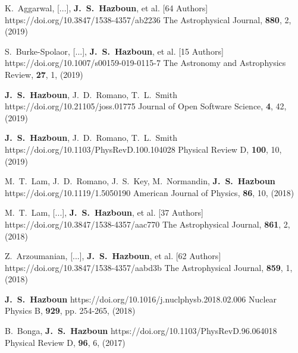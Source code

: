          {K.~{Aggarwal}, [...], \textbf{J.~S.~{Hazboun}}, et al. [64 Authors]}
         {https://doi.org/10.3847/1538-4357/ab2236}
         {{The Astrophysical Journal}, \textbf{880}, 2, (2019)}

         {S.~{Burke-Spolaor}, [...], \textbf{J.~S.~{Hazboun}}, et al. [15 Authors]}
         {https://doi.org/10.1007/s00159-019-0115-7}
         {{The Astronomy and Astrophysics Review}, \textbf{27}, 1, (2019)}

         {\textbf{J.~S.~Hazboun}, J.~D.~{Romano}, T.~L.~{Smith}}
         {https://doi.org/10.21105/joss.01775}
         {{Journal of Open Software Science}, \textbf{4}, 42, (2019)}

         {\textbf{J.~S.~Hazboun}, J.~D.~{Romano}, T.~L.~{Smith}}
         {https://doi.org/10.1103/PhysRevD.100.104028}
         {{Physical Review D}, \textbf{100}, 10, (2019)}

         {M.~T.~{Lam}, J.~D.~{Romano}, J.~S.~{Key}, M.~{Normandin}, \textbf{J.~S.~Hazboun}}
         {https://doi.org/10.1119/1.5050190}
         {{American Journal of Physics}, \textbf{86}, 10, (2018)}

         {M.~T.~{Lam}, [...], \textbf{J.~S.~{Hazboun}}, et al. [37 Authors]}
         {https://doi.org/10.3847/1538-4357/aac770}
         {{The Astrophysical Journal}, \textbf{861}, 2, (2018)}

         {Z.~{Arzoumanian}, [...], \textbf{J.~S.~{Hazboun}}, et al. [62 Authors]}
         {https://doi.org/10.3847/1538-4357/aabd3b}
         {{The Astrophysical Journal}, \textbf{859}, 1, (2018)}

         {\textbf{J.~S.~Hazboun}}
         {https://doi.org/10.1016/j.nuclphysb.2018.02.006}
         {{Nuclear Physics B}, \textbf{929}, pp. 254-265, (2018)}

         {B.~{Bonga}, \textbf{J.~S.~Hazboun}}
         {https://doi.org/10.1103/PhysRevD.96.064018}
         {{Physical Review D}, \textbf{96}, 6, (2017)}

